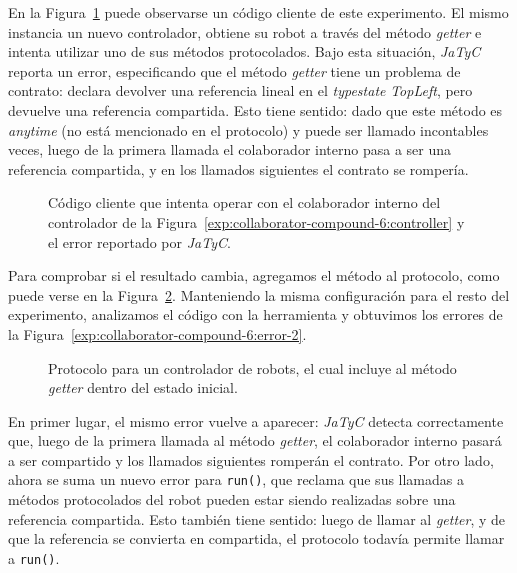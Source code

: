 En la Figura~\ref{exp:collaborator-compound-6:error} puede observarse un código cliente de este experimento. El mismo instancia un nuevo controlador, obtiene su robot a través del método \textit{getter} e intenta utilizar uno de sus métodos protocolados. Bajo esta situación, \textit{JaTyC} reporta un error, especificando que el método \textit{getter} tiene un problema de contrato: declara devolver una referencia lineal en el \textit{typestate} \textit{TopLeft}, pero devuelve una referencia compartida. Esto tiene sentido: dado que este método es \textit{anytime} (no está mencionado en el protocolo) y puede ser llamado incontables veces, luego de la primera llamada el colaborador interno pasa a ser una referencia compartida, y en los llamados siguientes el contrato se rompería.

\begin{figure}[htbp]
\centering

\vspace{0.3cm}

\caption{Código cliente que intenta operar con el colaborador interno del controlador de la Figura~\ref{exp:collaborator-compound-6:controller} y el error reportado por \textit{JaTyC}.}
\label{exp:collaborator-compound-6:error}
\end{figure}

Para comprobar si el resultado cambia, agregamos el método al protocolo, como puede verse en la Figura~\ref{exp:collaborator-compound-6:protocol-2}. Manteniendo la misma configuración para el resto del experimento, analizamos el código con la herramienta y obtuvimos los errores de la Figura~\ref{exp:collaborator-compound-6:error-2}.

\begin{figure}[htbp]
\centering

\caption{Protocolo para un controlador de robots, el cual incluye al método \textit{getter} dentro del estado inicial.}
\label{exp:collaborator-compound-6:protocol-2}
\end{figure}

En primer lugar, el mismo error vuelve a aparecer: \textit{JaTyC} detecta correctamente que, luego de la primera llamada al método \textit{getter}, el colaborador interno pasará a ser compartido y los llamados siguientes romperán el contrato. Por otro lado, ahora se suma un nuevo error para \texttt{run()}, que reclama que sus llamadas a métodos protocolados del robot pueden estar siendo realizadas sobre una referencia compartida. Esto también tiene sentido: luego de llamar al \textit{getter}, y de que la referencia se convierta en compartida, el protocolo todavía permite llamar a \texttt{run()}.

